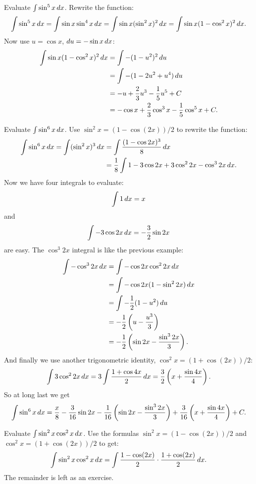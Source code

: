 \begin{example}
Evaluate $\int \sin^5 x\, d x$.
Rewrite the function:
$$
  \int \sin^5 x\, d x=\int \sin x \sin^4 x\, d x=
  \int \sin x (\sin^2 x)^2\, d x=
  \int \sin x (1-\cos^2 x)^2\, d x.
$$
Now use $u=\cos x$, $du=-\sin x\, d x$:
\begin{align*}
  \int \sin x (1-\cos^2 x)^2\, d x&=\int -(1-u^2)^2\, d u \\
  &=\int -(1-2u^2+u^4)\, d u \\
  &=-u+{2\over3}u^3-{1\over5}u^5+C \\
  &=-\cos x+{2\over3}\cos^3 x-{1\over5}\cos^5x+C. 
\end{align*}
\end{example}

\begin{example}
Evaluate $\int \sin^6 x\, d x$.
Use $\sin^2x =(1-\cos(2x))/2$ to
rewrite the function:
\begin{align*}
  \int \sin^6 x\, d x=\int (\sin^2 x)^3\, d x&=
  \int {(1-\cos 2x)^3\over 8}\, d x \\
  &={1\over 8}\int 1-3\cos 2x+3\cos^2 2x-\cos^3 2x\, d x.
\end{align*}
Now we have four integrals to evaluate:
$$\int 1\, d x=x$$
and
$$\int -3\cos 2x\, d x = -{3\over 2}\sin 2x$$
are easy. The $\cos^3 2x$ integral is like the previous example:
\begin{align*}
  \int -\cos^3 2x\, d x&=\int -\cos 2x\cos^2 2x\, d x \\
  &=\int -\cos 2x(1-\sin^2 2x)\, d x \\
  &=\int -{1\over 2}(1-u^2)\, d u \\
  &=-{1\over 2}\left(u-{u^3\over 3}\right) \\
  &=-{1\over 2}\left(\sin 2x-{\sin^3 2x\over 3}\right).
\end{align*}
And finally we use another trigonometric identity,
$\cos^2x=(1+\cos(2x))/2$:
$$
  \int 3\cos^2 2x\, d x=3\int {1+\cos 4x\over 2}\, d x=
  {3\over 2}\left(x+{\sin 4x\over 4}\right).
$$
So at long last we get
$$
  \int \sin^6 x\, d x = {x\over8} -{3\over 16}\sin 2x 
  -{1\over 16}\left(\sin 2x-{\sin^3 2x\over 3}\right)
  +{3\over 16}\left(x+{\sin 4x\over 4}\right)+C.
$$
\end{example}

\begin{example}
Evaluate $\int \sin^2x\cos^2x\, d x$. 
Use the formulas
$\sin^2x =(1-\cos(2x))/2$ and $\cos^2x =(1+\cos(2x))/2$ to get:
$$
  \int \sin^2x\cos^2x\, d x=\int {1-\cos(2x)\over2}\cdot
  {1+\cos(2x)\over2}\, d x.
$$
The remainder is left as an exercise.
\end{example}

